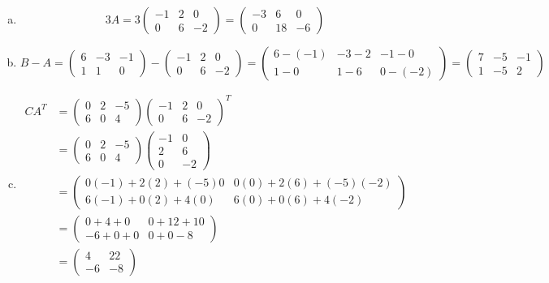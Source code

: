 \documentclass[11pt,letterpaper]{article}
\begin{document}
\sol 
\begin{enumerate}[(a)]
\item 
	\[
	3A= 3 \begin{pmatrix} -1 & 2 & 0 \\ 0 & 6 & -2 \end{pmatrix}= \begin{pmatrix} -3 & 6 & 0 \\ 0 & 18 & -6 \end{pmatrix}
	\] \pspace

\item 
	\[
	B - A= \begin{pmatrix} 6 & -3 & -1 \\ 1 & 1 & 0 \end{pmatrix} - \begin{pmatrix} -1 & 2 & 0 \\ 0 & 6 & -2 \end{pmatrix}= \begin{pmatrix} 6 - (-1) & -3 - 2 & -1 - 0 \\ 1 - 0 & 1 - 6 & 0 - (-2) \end{pmatrix}= \begin{pmatrix} 7 & -5 & -1 \\ 1 & -5 & 2 \end{pmatrix}
	\] \pspace

\item 
	\[
	\begin{aligned}
	CA^T&= \begin{pmatrix} 0 & 2 & -5 \\ 6 & 0 & 4 \end{pmatrix} \begin{pmatrix} -1 & 2 & 0 \\ 0 & 6 & -2 \end{pmatrix}^T \\[0.3cm]
	&= \begin{pmatrix} 0 & 2 & -5 \\ 6 & 0 & 4 \end{pmatrix} \begin{pmatrix} -1 & 0 \\ 2 & 6 \\ 0 & -2 \end{pmatrix} \\[0.3cm]
	&= \begin{pmatrix} 
	0(-1) + 2(2) + (-5)0 & 0(0) + 2(6) + (-5)(-2) \\
	6(-1) + 0(2) + 4(0) & 6(0) + 0(6) + 4(-2)
	\end{pmatrix} \\[0.3cm]
	&= \begin{pmatrix}
	0 + 4 + 0 & 0 + 12 + 10 \\
	-6 + 0 + 0 & 0 + 0 - 8
	\end{pmatrix} \\[0.3cm]
	&= \begin{pmatrix} 4 & 22 \\ -6 & -8 \end{pmatrix}
	\end{aligned}
	\]
\end{enumerate}
\end{document}
